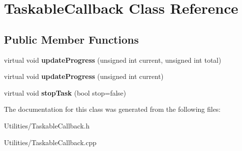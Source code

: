 \hypertarget{class_taskable_callback}{\section{Taskable\-Callback Class Reference}
\label{class_taskable_callback}
}
\subsection*{Public Member Functions}
\begin{DoxyCompactItemize}
\item 
\hypertarget{class_taskable_callback_ab97aa7fdd217837d1fac5fee72637b82}{virtual void {\bfseries update\-Progress} (unsigned int current, unsigned int total)}\label{class_taskable_callback_ab97aa7fdd217837d1fac5fee72637b82}

\item 
\hypertarget{class_taskable_callback_aa1382c7c0441664cac76a0861c2ba92b}{virtual void {\bfseries update\-Progress} (unsigned int current)}\label{class_taskable_callback_aa1382c7c0441664cac76a0861c2ba92b}

\item 
\hypertarget{class_taskable_callback_aa82a479049148db7abb3467df37de198}{virtual void {\bfseries stop\-Task} (bool stop=false)}\label{class_taskable_callback_aa82a479049148db7abb3467df37de198}

\end{DoxyCompactItemize}


The documentation for this class was generated from the following files\-:\begin{DoxyCompactItemize}
\item 
Utilities/Taskable\-Callback.\-h\item 
Utilities/Taskable\-Callback.\-cpp\end{DoxyCompactItemize}
